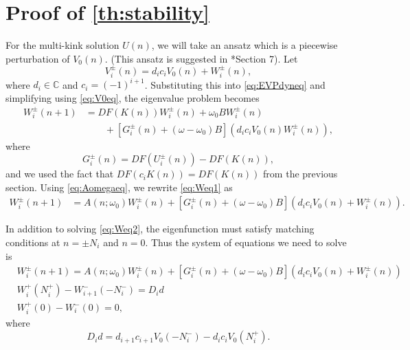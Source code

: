 \documentclass[12pt,reqno]{amsart}
\def\C{{\mathbb C}}
\begin{document}
\section{Proof of \cref{th:stability}}\label{sec:proof2}

For the multi-kink solution $U(n)$, we will take an ansatz which is a piecewise perturbation of $V_0(n)$. (This ansatz is suggested in \cite{Sandstede1998}*{Section 7}). Let
\begin{equation}\label{eq:Viansatz}
V_i^\pm(n) = d_i c_i V_0(n) + W_i^\pm(n),
\end{equation}
where $d_i \in \C$ and $c_i = (-1)^{i+1}$. Substituting this into \cref{eq:EVPdyneq} and simplifying using \cref{eq:V0eq}, the eigenvalue problem becomes
\begin{equation}\label{eq:Weq1}
\begin{aligned}
W_i^\pm(n+1)
&= DF(K(n)) W_i^\pm(n) + \omega_0 B W_i^\pm(n) \\
&\qquad + [G_i^\pm(n) + (\omega - \omega_0) B](d_i c_i V_0(n) W_i^\pm(n)),
\end{aligned}
\end{equation}
where
\begin{equation}\label{eq:Gipm}
G_i^\pm(n) = DF(U_i^\pm(n)) - DF(K(n)),
\end{equation}
and we used the fact that $DF(c_i K(n)) = DF(K(n))$ from the previous section. Using \cref{eq:Aomegaeq}, we rewrite \cref{eq:Weq1} as
\begin{align}\label{eq:Weq2}
W_i^\pm(n+1)
&= A(n; \omega_0) W_i^\pm(n) + [G_i^\pm(n) + (\omega - \omega_0) B](d_i c_i V_0(n) + W_i^\pm(n)).
\end{align}

In addition to solving \cref{eq:Weq2}, the eigenfunction must satisfy matching conditions at $n = \pm N_i$ and $n = 0$. Thus the system of equations we need to solve is
\begin{equation}\label{eq:eigWsystem1}
\begin{aligned}
& W_i^\pm(n+1)
= A(n; \omega_0) W_i^\pm(n) + [G_i^\pm(n) + (\omega - \omega_0) B](d_i c_i V_0(n) + W_i^\pm(n))\\
& W_i^+(N_i^+) - W_{i+1}^-(-N_i^-) = D_i d \\
& W_i^+(0) - W_i^-(0) = 0,
\end{aligned}
\end{equation}
where
\begin{equation}\label{defDid}
D_i d = d_{i+1} c_{i+1} V_0(-N_i^-) - d_i c_i V_0(N_i^+).
\end{equation}
\end{document}

